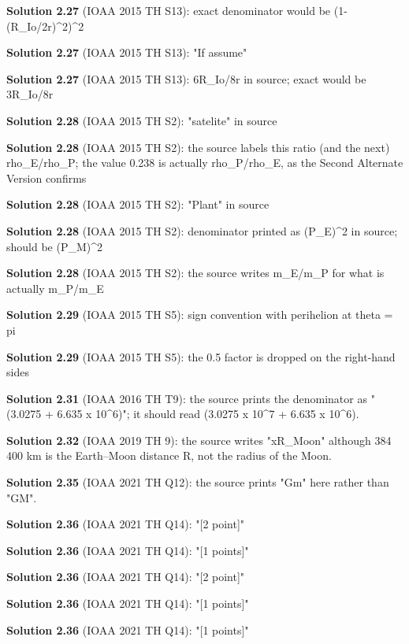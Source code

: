 \noindent\textbf{Solution 2.27} (IOAA 2015 TH S13): exact denominator would be (1-(R\_Io/2r)\^{}2)\^{}2
\smallskip

\noindent\textbf{Solution 2.27} (IOAA 2015 TH S13): "If assume"
\smallskip

\noindent\textbf{Solution 2.27} (IOAA 2015 TH S13): 6R\_Io/8r in source; exact would be 3R\_Io/8r
\smallskip

\noindent\textbf{Solution 2.28} (IOAA 2015 TH S2): "satelite" in source
\smallskip

\noindent\textbf{Solution 2.28} (IOAA 2015 TH S2): the source labels this ratio (and the next) rho\_E/rho\_P; the value 0.238 is actually rho\_P/rho\_E, as the Second Alternate Version confirms
\smallskip

\noindent\textbf{Solution 2.28} (IOAA 2015 TH S2): "Plant" in source
\smallskip

\noindent\textbf{Solution 2.28} (IOAA 2015 TH S2): denominator printed as (P\_E)\^{}2 in source; should be (P\_M)\^{}2
\smallskip

\noindent\textbf{Solution 2.28} (IOAA 2015 TH S2): the source writes m\_E/m\_P for what is actually m\_P/m\_E
\smallskip

\noindent\textbf{Solution 2.29} (IOAA 2015 TH S5): sign convention with perihelion at theta = pi
\smallskip

\noindent\textbf{Solution 2.29} (IOAA 2015 TH S5): the 0.5 factor is dropped on the right-hand sides
\smallskip

\noindent\textbf{Solution 2.31} (IOAA 2016 TH T9): the source prints the denominator as "(3.0275 + 6.635 x 10\^{}6)"; it should read (3.0275 x 10\^{}7 + 6.635 x 10\^{}6).
\smallskip

\noindent\textbf{Solution 2.32} (IOAA 2019 TH 9): the source writes "xR\_Moon" although 384 400 km is the Earth--Moon distance R, not the radius of the Moon.
\smallskip

\noindent\textbf{Solution 2.35} (IOAA 2021 TH Q12): the source prints "Gm" here rather than "GM".
\smallskip

\noindent\textbf{Solution 2.36} (IOAA 2021 TH Q14): "[2 point]"
\smallskip

\noindent\textbf{Solution 2.36} (IOAA 2021 TH Q14): "[1 points]"
\smallskip

\noindent\textbf{Solution 2.36} (IOAA 2021 TH Q14): "[2 point]"
\smallskip

\noindent\textbf{Solution 2.36} (IOAA 2021 TH Q14): "[1 points]"
\smallskip

\noindent\textbf{Solution 2.36} (IOAA 2021 TH Q14): "[1 points]"
\smallskip

